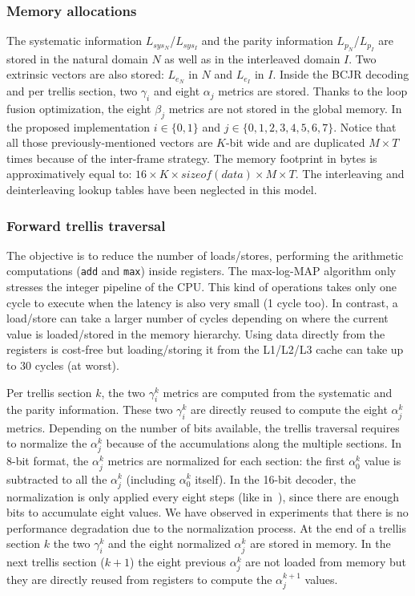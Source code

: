 \subsubsection{Memory allocations}

The systematic information $L_{sys_N}$/$L_{sys_I}$ and the parity information
$L_{p_N}$/$L_{p_I}$  are stored in the natural domain $N$ as well as in the
interleaved domain $I$. Two extrinsic vectors are also stored: $L_{e_N}$ in $N$
and $L_{e_I}$ in $I$. Inside the BCJR decoding and per trellis section, two
$\gamma_{i}$ and eight $\alpha_{j}$ metrics are stored. Thanks to the loop
fusion optimization, the eight $\beta_j$ metrics are not stored in the global
memory. In the proposed implementation $i \in \{0,1\}$ and
$j \in \{0,1,2,3,4,5,6,7\}$. Notice that all those previously-mentioned vectors
are $K$-bit wide and are duplicated $M\times T$ times because of the inter-frame
strategy. The memory footprint in bytes is approximatively equal to:
$16 \times K \times sizeof(data) \times M \times T$.
The interleaving and deinterleaving lookup tables have been neglected in this
model.

\subsubsection{Forward trellis traversal}

The objective is to reduce the number of loads/stores, performing the arithmetic
computations (\verb|add| and \verb|max|) inside registers. The max-log-MAP
algorithm only stresses the integer pipeline of the CPU. This kind of operations
takes only one cycle to execute when the latency is also very small (1 cycle
too). In contrast, a load/store can take a larger number of cycles depending on
where the current value is loaded/stored in the memory hierarchy. Using data
directly from the registers is cost-free but loading/storing it from the
L1/L2/L3 cache can take up to 30 cycles (at worst).

Per trellis section $k$, the two $\gamma_i^k$ metrics are computed from the
systematic and the parity information. These two $\gamma_i^k$ are directly
reused to compute the eight $\alpha_j^k$ metrics. Depending on the number of
bits available, the trellis traversal requires to normalize the $\alpha_j^k$
because of the accumulations along the multiple sections.  In 8-bit format, the
$\alpha_j^k$ metrics are normalized for each section: the first $\alpha_0^k$
value is subtracted to all the $\alpha_j^k$ (including $\alpha_0^k$ itself). In
the 16-bit decoder, the normalization is only applied every eight steps (like
in~\cite{Wu2013}), since there are enough bits to accumulate eight values. We
have observed in experiments that there is no performance degradation due to the
normalization process. At the end of a trellis section $k$ the two $\gamma_i^k$
and the eight normalized $\alpha_j^k$ are stored in  memory. In the next trellis
section ($k+1$) the eight previous $\alpha_j^k$ are not loaded from memory but
they are directly reused from registers to compute the $\alpha_j^{k+1}$ values.

